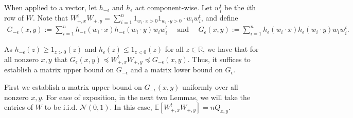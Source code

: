 \documentclass[11pt]{article}
\newcommand{\R}{\mathbb{R}}
\newcommand{\eps}{\epsilon}
\newcommand{\calN}{\mathcal{N}}
\newcommand{\tran}{t}
\newcommand{\Wplus}[1]{W_{+, #1}}
\newcommand{\Wpx}{\Wplus{x}}
\newcommand{\Wpy}{\Wplus{y}}
\newcommand{\indwx}{1_{w_i \cdot x > 0}}
\newcommand{\indwy}{1_{w_i \cdot y > 0}}
\newcommand{\wi}{w_i}
\newcommand{\wix}{w_i \cdot x}
\newcommand{\wiy}{w_i \cdot y}
\newcommand{\wit}{w_i^\tran}
\newcommand{\Wpxt}{\Wpx^\tran}
\newcommand{\WpxtWpy}{\Wpx^\tran \Wpy}
\newcommand{\hmeps}{h_{-\eps}}
\newcommand{\Gmeps}{G_{-\eps}}
\newcommand{\heps}{h_{\eps}}
\newcommand{\Geps}{G_{\eps}}
\newcommand{\wiwit}{\wi\wit}
\newcommand{\matrixleq}{\preceq}
\newcommand{\E}{\mathbb{E}}
\newcommand{\Qxy}{Q_{x,y}}
\begin{document}
When applied to a vector, let $\hmeps$ and $\heps$ act component-wise.
Let $\wit$ be the $i$th row of $W$.  Note that $\WpxtWpy = \sum_{i=1}^n \indwx \indwy \cdot \wi \wit$, and define 
\begin{align*}
\Gmeps(x, y) :=  \sum_{i=1}^n \hmeps(\wix) \hmeps(\wiy) \wiwit \quad  \text{ and } \quad
\Geps(x,y) :=  \sum_{i=1}^n \heps(\wix) \heps(\wiy) \wiwit.
\end{align*}

As $\hmeps(z) \geq 1_{z>0}(z)$ and $\heps(z) \leq 1_{z<0}(z)$ for all $z \in \R$, we have that for all nonzero $x,y$ that $\Geps(x,y) \matrixleq \WpxtWpy \matrixleq \Gmeps(x,y)$.  Thus, it suffices to establish a matrix upper bound on $\Gmeps$ and a matrix lower bound on $\Geps$. 

First we establish a matrix upper bound on $\Gmeps(x,y)$ uniformly over all nonzero $x,y$.  For ease of exposition, in the next two Lemmas, we will take the entries of $W$ to be i.i.d. $\calN(0,1)$.  In this case, $\E[\Wpxt \Wpy]=n \Qxy$. 
\end{document}

